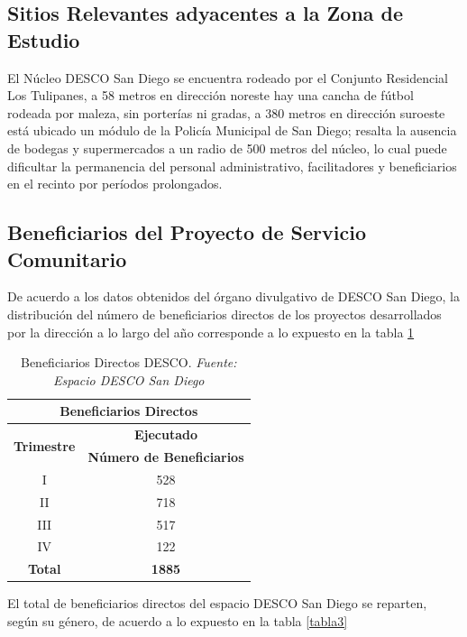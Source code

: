\documentclass[11pt, a4paper, twosides]{report}
\begin{document}
\subsection{Sitios Relevantes adyacentes a la Zona de Estudio}
El Núcleo DESCO San Diego se encuentra rodeado por el Conjunto Residencial Los Tulipanes, a 58 metros en dirección noreste hay una cancha de fútbol rodeada por maleza, sin porterías ni gradas, a 380 metros en dirección suroeste está ubicado un módulo de la Policía Municipal de San Diego; resalta la ausencia de bodegas y supermercados a un radio de 500 metros del núcleo, lo cual puede dificultar la permanencia del personal administrativo, facilitadores y beneficiarios en el recinto por períodos prolongados.

\subsection{Beneficiarios del Proyecto de Servicio Comunitario}
De acuerdo a los datos obtenidos del órgano divulgativo de DESCO San Diego, la distribución del número de beneficiarios directos de los proyectos desarrollados por la dirección a lo largo del año corresponde a lo expuesto en la tabla \ref{tabla2}

\begin{table}[h]
	\centering
	\begin{tabular}{|c|c|}
		\hline
		\multicolumn{2}{|c|}{\cellcolor{gray75} \textbf{Beneficiarios Directos}}                  \\ \hline
		\multirow{2}{*}{\textbf{Trimestre}} & \textbf{Ejecutado}               \\ \cline{2-2} 
		& \textbf{Número de Beneficiarios} \\ \hline
		I                                   & 528                              \\ \hline
		II                                  & 718                              \\ \hline
		III                                 & 517                              \\ \hline
		IV                                  & 122                              \\ \hline
		\textbf{Total}                      & \textbf{1885}                    \\ \hline
	\end{tabular}
		\caption{Beneficiarios Directos DESCO. \textit{Fuente: Espacio DESCO San Diego}}
		\label{tabla2}
\end{table}
El total de beneficiarios directos del espacio DESCO San Diego se reparten, según su género, de acuerdo a lo expuesto en la tabla \ref{tabla3}
\end{document}
